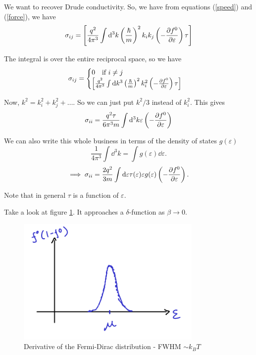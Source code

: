 \documentclass[a4paper]{article}
\newcommand{\hcut}{\hbar}
\begin{document}
We want to recover Drude conductivity. So, we have from equations (\ref{speed}) and (\ref{force}), we have 
\begin{equation}
	\sigma_{ij} = \left[ \frac{q^2}{4\pi^3} \int \dd ^3 k \left( \frac{\hcut}{m} \right) ^2k_i k_j \left( -\pdv{f^{0}}{\varepsilon} \right) \tau  \right]
\end{equation}

The integral is over the entire reciprocal space, so we have
\begin{equation}
	\sigma_{ij} = \begin{cases}
		0\quad \text{if }i\neq j\\
		\left[ \frac{q^2}{4\pi^3}\int \dd k ^3 \left( \frac{\hcut}{m} \right) ^2 k_i^2\left( -\pdv{f^{0}}{\varepsilon} \right)\tau  \right] 
	\end{cases}
\end{equation}

Now, $k^2 = k_i^2 + k_j ^2 + \ldots$. So we can just put $k^2/3$
instead of $k_i ^2$. This gives
\begin{equation}
	\sigma_{ii} = \frac{q^2\tau}{6\pi^3m}\int \dd ^3 k \varepsilon \left( -\pdv{f^{0}}{\varepsilon} \right) 
\end{equation}

We can also write this whole business in terms of the density
of states $g(\varepsilon)$
\[
	\frac{1}{4\pi^3} \int \dd ^3 k = \int g(\varepsilon) \dd \varepsilon
.\] 
\begin{equation}
	\implies \sigma_{ii} = \frac{2q^2}{3m}\int \dd \varepsilon \tau(\varepsilon) \varepsilon
	g(\varepsilon) \left( -\pdv{f^{0}}{\varepsilon} \right) .
\end{equation}

Note that in general $\tau$ is a function of $\varepsilon$.


Take a look at figure \ref{fig:figures-fddv-png}. It approaches
a  $\delta$-function as $\beta \to  0$.
\begin{figure}[h]
	\centering
	\includegraphics[width=0.8\textwidth]{figures/fddv.png}
	\caption{Derivative of the Fermi-Dirac distribution - FWHM $\sim k_BT$}
	\label{fig:figures-fddv-png}
\end{figure}
\end{document}
